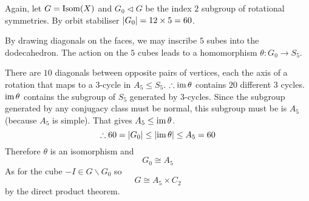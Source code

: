\documentclass{article}
\begin{document}
\begin{eg}
    Again, let $G = \operatorname{Isom}(X)$ and $G_0 \triangleleft G$ be the index $2$ subgroup of rotational symmetries.
    By orbit stabiliser $\left\lvert G_0\right\rvert = 12 \times 5 = 60$.
    
    By drawing diagonals on the faces, we may inscribe $5$ subes into the dodecahedron.
    The action on the $5$ cubes leads to a homomorphism $\theta: G_0 \rightarrow S_5$.

    There are $10$ diagonals between opposite pairs of vertices, each the axis of a rotation that maps to a $3$-cycle in $A_5 \leq S_5$.
    $\therefore \operatorname{im} \theta$ contains $20$ different $3$ cycles.
    $\operatorname{im} \theta$ contains the subgroup of $S_5$ generated by $3$-cycles.
    Since the subgroup generated by any conjugacy class must be normal, this subgroup must be is $A_5$ (because $A_5$ is simple). 
    That gives $A_5 \leq \operatorname{im} \theta$.
    \[
        \therefore 60 = \left\lvert G_0\right\rvert \leq \left\lvert \operatorname{im} \theta\right\rvert \leq A_5 = 60
    \]
    Therefore $\theta$ is an isomorphism and
    \[
        G_0 \cong A_5  
    \]
    As for the cube $-I \in G \backslash G_0$ so
    \[
        G \cong A_5 \times C_2  
    \]
    by the direct product theorem.
\end{eg}
\end{document}
